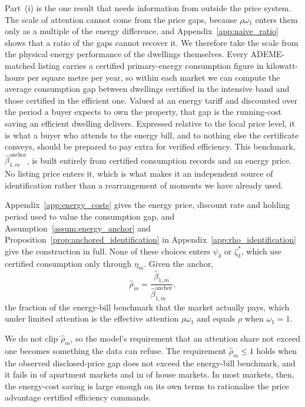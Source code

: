 Part~(i) is the one result that needs information from outside the price system. The scale of attention cannot come from the price gaps, because $\rho\omega_1$ enters them only as a multiple of the energy difference, and Appendix~\ref{app:naive_ratio} shows that a ratio of the gaps cannot recover it. We therefore take the scale from the physical energy performance of the dwellings themselves. Every ADEME-matched listing carries a certified primary-energy consumption figure in kilowatt-hours per square metre per year, so within each market we can compute the average consumption gap between dwellings certified in the intensive band and those certified in the efficient one. Valued at an energy tariff and discounted over the period a buyer expects to own the property, that gap is the running-cost saving an efficient dwelling delivers. Expressed relative to the local price level, it is what a buyer who attends to the energy bill, and to nothing else the certificate conveys, should be prepared to pay extra for verified efficiency. This benchmark, $\hat\beta_{1,m}^{\mathrm{anchor}}$, is built entirely from certified consumption records and an energy price. No listing price enters it, which is what makes it an independent source of identification rather than a rearrangement of moments we have already used.

Appendix~\ref{app:energy_costs} gives the energy price, discount rate and holding period used to value the consumption gap, and Assumption~\ref{assum:energy_anchor} and Proposition~\ref{prop:anchored_identification} in Appendix~\ref{app:rho_identification} give the construction in full. None of these choices enters $\psi_\delta$ or $\zeta^*_\delta$, which use certified consumption only through $\eta_m$. Given the anchor,
\begin{equation}
    \hat\rho_m = \frac{\hat\beta_{1,m}}{\hat\beta_{1,m}^{\mathrm{anchor}}},
    \label{eq:anchored_estimator_main}
\end{equation}
the fraction of the energy-bill benchmark that the market actually pays, which under limited attention is the effective attention $\rho\omega_1$ and equals $\rho$ when $\omega_1=1$.

We do not clip $\hat\rho_m$, so the model's requirement that an attention share not exceed one becomes something the data can refuse. The requirement $\hat\rho_m\le1$ holds when the observed disclosed-price gap does not exceed the energy-bill benchmark, and it fails in \attNRhoGtOneApt{} of \attNMarketsApt{} apartment markets and in \attNRhoGtOneHouse{} of \attNMarketsHouse{} house markets. In most markets, then, the energy-cost saving is large enough on its own terms to rationalise the price advantage certified efficiency commands.

